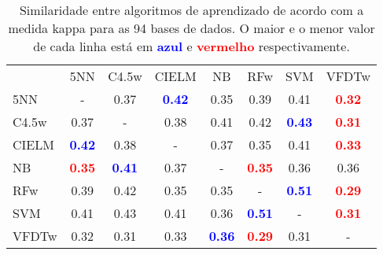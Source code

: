 \begin{table}[h]
\caption{Similaridade entre algoritmos de aprendizado de acordo com a medida kappa para as 94 bases de dados. O maior e o menor valor de cada linha está em \textcolor{blue}{\textbf{azul}} e \textcolor{red}{\textbf{vermelho}} respectivamente.}
\begin{center}\begin{tabular}{lcc|cc|cc|c}
 				& 5NN & C4.5w & CIELM & NB & RFw & SVM & VFDTw \\5NN	& - &   0.37 & \textcolor{blue}{\textbf{  0.42}} &   0.35 &   0.39 &   0.41 & \textcolor{red}{\textbf{  0.32}} \\
C4.5w	&   0.37 & - &   0.38 &   0.41 &   0.42 & \textcolor{blue}{\textbf{  0.43}} & \textcolor{red}{\textbf{  0.31}} \\ \hline
CIELM	& \textcolor{blue}{\textbf{  0.42}} &   0.38 & - &   0.37 &   0.35 &   0.41 & \textcolor{red}{\textbf{  0.33}} \\
NB	& \textcolor{red}{\textbf{  0.35}} & \textcolor{blue}{\textbf{  0.41}} &   0.37 & - & \textcolor{red}{\textbf{  0.35}} &   0.36 &   0.36 \\ \hline
RFw	&   0.39 &   0.42 &   0.35 &   0.35 & - & \textcolor{blue}{\textbf{  0.51}} & \textcolor{red}{\textbf{  0.29}} \\
SVM	&   0.41 &   0.43 &   0.41 &   0.36 & \textcolor{blue}{\textbf{  0.51}} & - & \textcolor{red}{\textbf{  0.31}} \\ \hline
VFDTw	&   0.32 &   0.31 &   0.33 & \textcolor{blue}{\textbf{  0.36}} & \textcolor{red}{\textbf{  0.29}} &   0.31 & - \\\end{tabular}\label{passiveDists}
\end{center}
\end{table}